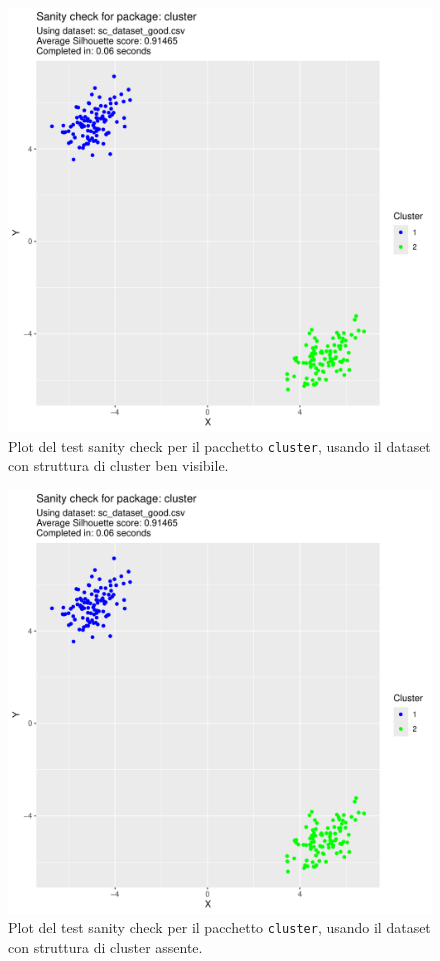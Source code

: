 \documentclass[italian]{article}
\begin{document}
			\begin{figure}[h]
				\includegraphics[width = \textwidth, page = 1]{results/results_CLUSTER.pdf}
				\caption{Plot del test sanity check per il pacchetto \texttt{cluster},
				usando il dataset con struttura di cluster ben visibile.}
				\label{fig:clustergood}
			\end{figure}

			\begin{figure}[h]
				\includegraphics[width = \textwidth, page = 2]{results/results_CLUSTER.pdf}
				\caption{Plot del test sanity check per il pacchetto \texttt{cluster},
				usando il dataset con struttura di cluster assente.}
				\label{fig:clusterbad}
			\end{figure}
\end{document}
